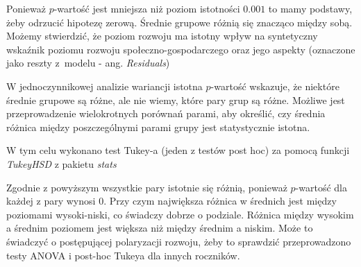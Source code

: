 \documentclass{amuthesis}
\begin{document}
Ponieważ \(p\)-wartość jest mniejsza niż poziom istotności \(0.001\) to mamy podstawy, żeby odrzucić hipotezę zerową.
Średnie grupowe różnią się znacząco między sobą.
Możemy stwierdzić, że poziom rozwoju ma istotny wpływ na syntetyczny wskaźnik poziomu rozwoju społeczno-gospodarczego oraz jego aspekty (oznaczone jako reszty z~modelu - ang. \emph{Residuals})

W jednoczynnikowej analizie wariancji istotna \(p\)-wartość wskazuje, że niektóre średnie grupowe są różne, ale nie wiemy, które pary grup są różne.
Możliwe jest przeprowadzenie wielokrotnych porównań parami, aby określić, czy średnia różnica między poszczególnymi parami grupy jest statystycznie istotna.

W tym celu wykonano test Tukey-a (jeden z testów post hoc) za pomocą funkcji \emph{TukeyHSD} z pakietu \emph{stats}

\begin{Shaded}
\begin{Highlighting}[]
\CommentTok{\#\textgreater{} }
\CommentTok{\#\textgreater{} }
\end{Highlighting}
\end{Shaded}

Zgodnie z powyższym wszystkie pary istotnie się różnią, ponieważ \(p\)-wartość dla każdej z pary wynosi \(0\).
Przy czym największa różnica w średnich jest między poziomami wysoki-niski, co świadczy dobrze o podziale. Różnica między wysokim a średnim poziomem jest większa niż między średnim a niskim.
Może to świadczyć o postępującej polaryzacji rozwoju, żeby to sprawdzić przeprowadzono testy ANOVA i post-hoc Tukeya dla innych roczników.
\end{document}
